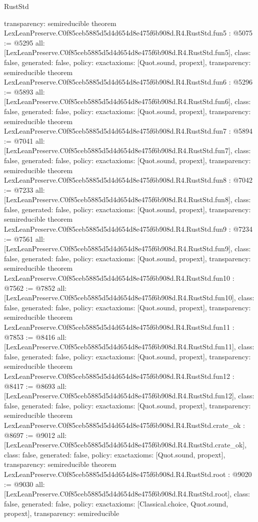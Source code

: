 \begin{lexlean}{RustStd}
\begin{coremodule}
{  transparency: semireducible
}
theorem LexLeanPreserve.C0f85ceb5885d5d4d654d8e475f6b908d.R4.RustStd.fun5 : @5075 := @5295 {
  all: [LexLeanPreserve.C0f85ceb5885d5d4d654d8e475f6b908d.R4.RustStd.fun5],
  class: false,
  generated: false,
  policy: exact{axioms: [Quot.sound, propext]},
  transparency: semireducible
}
theorem LexLeanPreserve.C0f85ceb5885d5d4d654d8e475f6b908d.R4.RustStd.fun6 : @5296 := @5893 {
  all: [LexLeanPreserve.C0f85ceb5885d5d4d654d8e475f6b908d.R4.RustStd.fun6],
  class: false,
  generated: false,
  policy: exact{axioms: [Quot.sound, propext]},
  transparency: semireducible
}
theorem LexLeanPreserve.C0f85ceb5885d5d4d654d8e475f6b908d.R4.RustStd.fun7 : @5894 := @7041 {
  all: [LexLeanPreserve.C0f85ceb5885d5d4d654d8e475f6b908d.R4.RustStd.fun7],
  class: false,
  generated: false,
  policy: exact{axioms: [Quot.sound, propext]},
  transparency: semireducible
}
theorem LexLeanPreserve.C0f85ceb5885d5d4d654d8e475f6b908d.R4.RustStd.fun8 : @7042 := @7233 {
  all: [LexLeanPreserve.C0f85ceb5885d5d4d654d8e475f6b908d.R4.RustStd.fun8],
  class: false,
  generated: false,
  policy: exact{axioms: [Quot.sound, propext]},
  transparency: semireducible
}
theorem LexLeanPreserve.C0f85ceb5885d5d4d654d8e475f6b908d.R4.RustStd.fun9 : @7234 := @7561 {
  all: [LexLeanPreserve.C0f85ceb5885d5d4d654d8e475f6b908d.R4.RustStd.fun9],
  class: false,
  generated: false,
  policy: exact{axioms: [Quot.sound, propext]},
  transparency: semireducible
}
theorem LexLeanPreserve.C0f85ceb5885d5d4d654d8e475f6b908d.R4.RustStd.fun10 : @7562 := @7852 {
  all: [LexLeanPreserve.C0f85ceb5885d5d4d654d8e475f6b908d.R4.RustStd.fun10],
  class: false,
  generated: false,
  policy: exact{axioms: [Quot.sound, propext]},
  transparency: semireducible
}
theorem LexLeanPreserve.C0f85ceb5885d5d4d654d8e475f6b908d.R4.RustStd.fun11 : @7853 := @8416 {
  all: [LexLeanPreserve.C0f85ceb5885d5d4d654d8e475f6b908d.R4.RustStd.fun11],
  class: false,
  generated: false,
  policy: exact{axioms: [Quot.sound, propext]},
  transparency: semireducible
}
theorem LexLeanPreserve.C0f85ceb5885d5d4d654d8e475f6b908d.R4.RustStd.fun12 : @8417 := @8693 {
  all: [LexLeanPreserve.C0f85ceb5885d5d4d654d8e475f6b908d.R4.RustStd.fun12],
  class: false,
  generated: false,
  policy: exact{axioms: [Quot.sound, propext]},
  transparency: semireducible
}
theorem LexLeanPreserve.C0f85ceb5885d5d4d654d8e475f6b908d.R4.RustStd.crate_ok : @8697 := @9012 {
  all: [LexLeanPreserve.C0f85ceb5885d5d4d654d8e475f6b908d.R4.RustStd.crate_ok],
  class: false,
  generated: false,
  policy: exact{axioms: [Quot.sound, propext]},
  transparency: semireducible
}
theorem LexLeanPreserve.C0f85ceb5885d5d4d654d8e475f6b908d.R4.RustStd.root : @9020 := @9030 {
  all: [LexLeanPreserve.C0f85ceb5885d5d4d654d8e475f6b908d.R4.RustStd.root],
  class: false,
  generated: false,
  policy: exact{axioms: [Classical.choice, Quot.sound, propext]},
  transparency: semireducible
}


\end{coremodule}
\end{lexlean}
